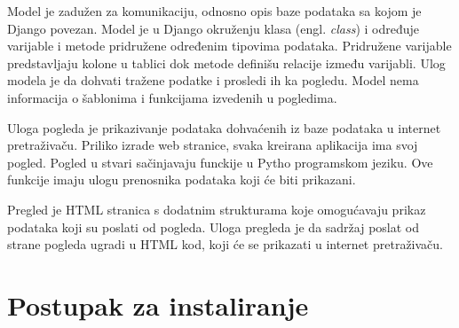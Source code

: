 \documentclass[12pt]{article}
\begin{document}
Model je zadužen za komunikaciju, odnosno opis baze podataka sa kojom je Django povezan. Model je u Django okruženju klasa (engl. \textsl{class}) i određuje varijable i metode pridružene određenim tipovima podataka. Pridružene varijable predstavljaju kolone u tablici dok metode definišu relacije između varijabli.  Ulog modela je da dohvati tražene podatke i prosledi ih ka pogledu. Model nema informacija o šablonima i funkcijama izvedenih u pogledima. 

Uloga pogleda je prikazivanje podataka dohvaćenih iz baze podataka u internet pretraživaču. Priliko izrade web stranice, svaka kreirana aplikacija ima svoj pogled.  Pogled u stvari sačinjavaju funckije u Pytho programskom jeziku.  Ove funkcije imaju ulogu prenosnika podataka koji će biti prikazani.  

Pregled je HTML stranica s dodatnim strukturama koje omogućavaju prikaz podataka koji su poslati od pogleda.  Uloga pregleda je da sadržaj poslat od strane pogleda ugradi u HTML kod, koji će se prikazati u internet pretraživaču. 

\newpage
\section{Postupak za instaliranje}
\end{document}
